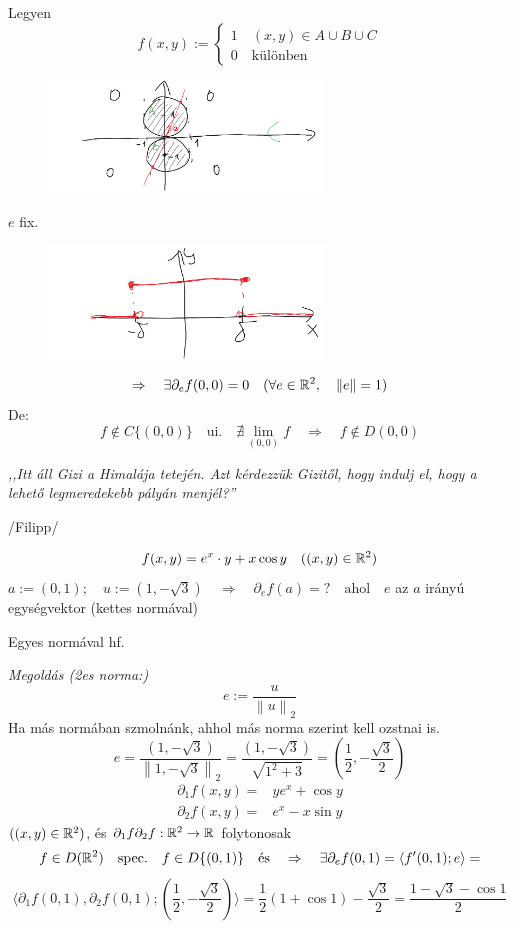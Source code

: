 \documentclass[a4paper,11.5pt]{article}
\newcommand{\norm}[1]{\left\lVert#1\right\rVert}
\begin{document}
	\begin{note}
		Legyen
		\[ f(x,y):=\begin{cases}
			1\quad (x,y)\in A\cup B\cup C\\
			0\quad \text{különben}
		\end{cases} \]
		\begin{figure}[H]
			\centering
			\includegraphics[height=3cm]{kepek/34.png}
			\caption{}
		\end{figure}
		$e$ fix.
		\begin{figure}[H]
			\centering
			\includegraphics[height=3cm]{kepek/35.png}
			\caption{}
		\end{figure}
		\[ \Rightarrow\quad \exists\partial_ef(0,0)=0\quad (\forall e\in\R^2,\quad \norm{e}=1) \]
		De:
		\[ f\notin C\{(0,0)\} \quad \text{ui.}\quad \nexists\lim_{(0,0)}f\quad \Rightarrow\quad f\notin D(0,0) \]
	\end{note}
	\begin{center}
		\textit{,,Itt áll Gizi a Himalája tetején. Azt kérdezzük Gizitől, hogy indulj el, hogy a lehető legmeredekebb pályán menjél?''}
		
		/Filipp/
	\end{center}
	\begin{task}
		\[ f(x,y)=e^x\cdot y+x\cos y\quad ((x,y)\in\mathbb{R}^2) \]
		$a:=(0,1);\quad u:=(1,-\sqrt{3})\quad \Rightarrow\quad \partial_ef(a)=?\quad \text{ahol}\quad e$ az $a$ irányú egységvektor (kettes normával)
		
		Egyes normával hf.
		
		\textit{Megoldás (2es norma:)} 
		\[ e:=\frac{u}{\norm{u}_2} \]
		Ha más normában szmolnánk, ahhol más norma szerint kell ozstnai is.
		\[ e=\frac{(1,-\sqrt{3})}{\norm{1,-\sqrt{3}}_2}=\frac{(1,-\sqrt{3})}{ \sqrt{1^2+3}}=\left(\frac{1}{2},-\frac{\sqrt{3}}{2}\right) \]
		\begin{align*}
			\partial_1f(x,y)=&ye^x+\cos y\\
			\partial_2f(x,y)=&e^x-x\sin y
		\end{align*}
		$((x,y)\in\mathbb{R}^2)$, és $\partial_1f\partial_2f:\mathbb{R}^2\to\mathbb{R}$ folytonosak
		\[ f\in D(\mathbb{R}^2)\quad \text{spec.}\quad f\in D\{(0,1)\}\quad \text{és}\quad \Rightarrow\quad \exists\partial_ef(0,1)=\langle f'(0,1);e\rangle=\]\[\langle \partial_1f(0,1),\partial_2f(0,1);\left(\frac{1}{2},-\frac{\sqrt{3}}{2}\right)\rangle=\frac{1}{2}(1+\cos 1)-\frac{\sqrt{3}}{2}=\frac{1-\sqrt{3}-\cos1}{2} \]
	\end{task}
\end{document}
